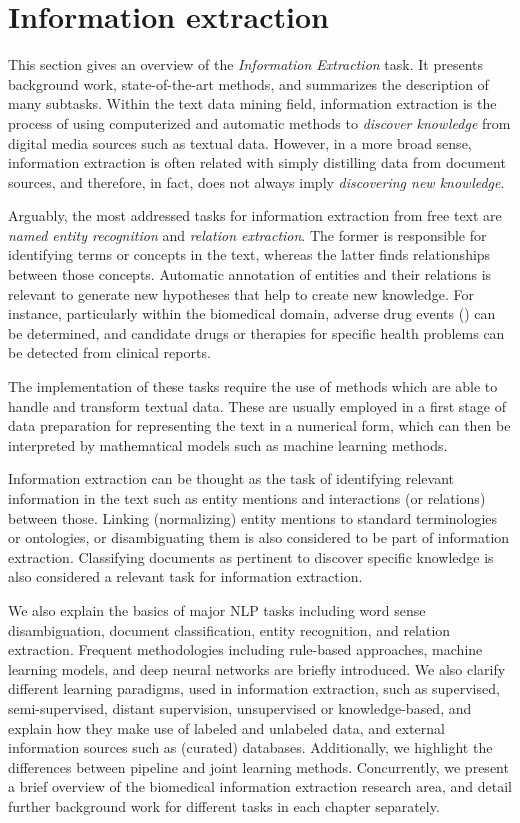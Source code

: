 \section{Information extraction}

This section gives an overview of the \textit{Information Extraction} task.
It presents background work, state-of-the-art methods, and summarizes the description of many subtasks.
Within the text data mining field, information extraction is the process of using computerized and automatic methods to \textit{discover knowledge} from digital media sources such as textual data.
However, in a more broad sense, information extraction is often related with simply distilling data from document sources, and therefore, in fact, does not always imply \textit{discovering new knowledge}.

Arguably, the most addressed tasks for information extraction from free text are \textit{named entity recognition} and \textit{relation extraction}.
The former is responsible for identifying terms or concepts in the text, whereas the latter finds relationships between those concepts.
Automatic annotation of entities and their relations is relevant to generate new hypotheses that help to create new knowledge.
For instance, particularly within the biomedical domain, adverse drug events () can be determined, and candidate drugs or therapies for specific health problems can be detected from clinical reports.

The implementation of these tasks require the use of  methods which are able to handle and transform textual data.
These are usually employed in a first stage of data preparation for representing the text in a numerical form, which can then be interpreted by mathematical models such as machine learning methods.

Information extraction can be thought as the task of identifying relevant information in the text such as entity mentions and interactions (or relations) between those.
Linking (normalizing) entity mentions to standard terminologies or ontologies, or disambiguating them is also considered to be part of information extraction.
Classifying documents as pertinent to discover specific knowledge is also considered a relevant task for information extraction.

We also explain the basics of major NLP tasks including word sense disambiguation, document classification, entity recognition, and relation extraction.
Frequent methodologies including rule-based approaches, machine learning models, and deep neural networks are briefly introduced.
We also clarify different learning paradigms, used in information extraction, such as supervised, semi-supervised, distant supervision, unsupervised or knowledge-based, and explain how they make use of labeled and unlabeled data, and external information sources such as (curated) databases.
Additionally, we highlight the differences between pipeline and joint learning methods.
Concurrently, we present a brief overview of the biomedical information extraction research area, and detail further background work for different tasks in each chapter separately.


